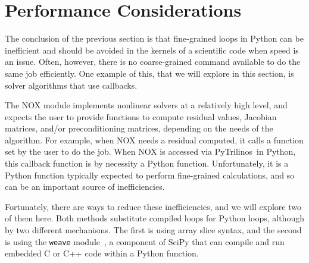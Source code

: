 \documentclass[acmtocl]{acmtrans2m}
\newcommand{\PyTrilinos}{{PyTrilinos}}
\begin{document}
\section{Performance Considerations}
\label{sec:performance}

The conclusion of the previous section is that fine-grained loops in
Python can be inefficient and should be avoided in the kernels of a
scientific code when speed is an issue.  Often, however, there is no
coarse-grained command available to do the same job efficiently.  One
example of this, that we will explore in this section, is solver
algorithms that use callbacks.

The NOX module implements nonlinear solvers at a relatively high
level, and expects the user to provide functions to compute residual
values, Jacobian matrices, and/or preconditioning matrices, depending
on the needs of the algorithm.  For example, when NOX needs a residual
computed, it calls a function set by the user to do the job.  When NOX
is accessed via \PyTrilinos\ in Python, this callback function is by
necessity a Python function.  Unfortunately, it is a Python function
typically expected to perform fine-grained calculations, and so can be
an important source of inefficiencies.

Fortunately, there are ways to reduce these inefficiencies, and we
will explore two of them here.  Both methods substitute compiled loops
for Python loops, although by two different mechanisms.  The first is
using array slice syntax, and the second is using the {\tt weave}
module~\cite{Weave-Users-Guide}, a component of SciPy that can compile
and run embedded C or C++ code within a Python function.
\end{document}
